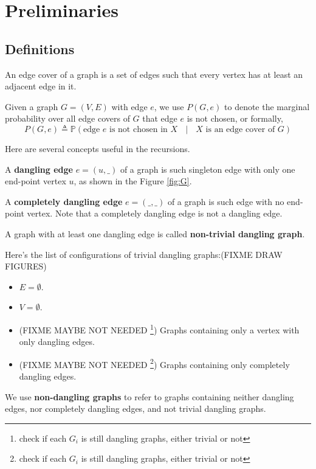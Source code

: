 
\section{Preliminaries}
\subsection{Definitions}
An edge cover of a graph is a set of edges such that every vertex has at least an adjacent edge in it.

Given a graph $G=(V,E)$ with edge $e$,  we use $P(G, e)$ to denote the marginal probability over all edge covers of $G$ that edge $e$ is not chosen, or formally,
\begin{equation}
	P(G, e) \triangleq \mathbb{P} \left(\textrm{edge $e$ is not chosen in $X$ } \mid \textrm{ $X$ is an edge cover of $G$} \right)
	\label{defpge}
\end{equation}

Here are several concepts useful in the recursions.
\begin{Def}
	A {\bf dangling edge} $e=(u,\_)$ of a graph is such singleton edge with only one end-point vertex $u$, as shown in the Figure \ref{fig:G}.

	A {\bf completely dangling edge} $e=(\_, \_)$ of a graph is such edge with no end-point vertex. Note that a completely dangling edge is not a dangling edge.

	A graph with at least one dangling edge is called {\bf non-trivial dangling graph}.

	Here's the list of configurations of trivial dangling graphs:(FIXME DRAW FIGURES) 
	\begin{itemize}
		\item  $E=\emptyset$.
		\item $V=\emptyset$.
		\item (FIXME MAYBE NOT NEEDED \footnote{check if each $G_i$ is still dangling graphs, either trivial or not}) Graphs containing only a vertex with only dangling edges.
		\item (FIXME MAYBE NOT NEEDED \footnote{check if each $G_i$ is still dangling graphs, either trivial or not}) Graphs containing only completely dangling edges.
	\end{itemize}

	We use {\bf non-dangling graphs} to refer to graphs containing neither dangling edges, nor completely dangling edges, and not trivial dangling graphs.
\end{Def}


